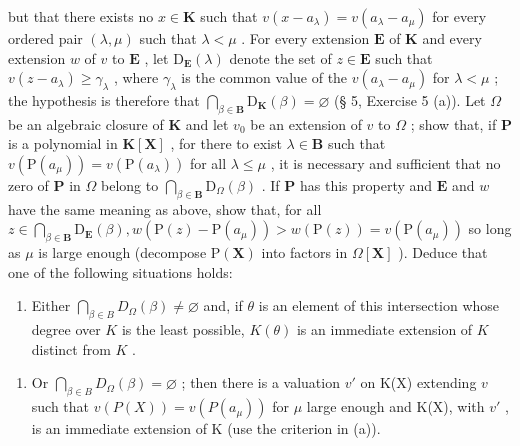 but that there exists no \(x \in \mathbf{K}\) such that \(v(x - a_{\lambda}) = v(a_{\lambda} - a_{\mu})\) for every ordered pair \((\lambda, \mu)\) such that \(\lambda < \mu\) . For every extension \(\mathbf{E}\) of \(\mathbf{K}\) and every extension \(w\) of \(v\) to \(\mathbf{E}\) , let \(\mathrm{D}_{\mathbf{E}}(\lambda)\) denote the set of \(z \in \mathbf{E}\) such that \(v(z - a_{\lambda}) \geqslant \gamma_{\lambda}\) , where \(\gamma_{\lambda}\) is the common value of the \(v(a_{\lambda} - a_{\mu})\) for \(\lambda < \mu\) ; the hypothesis is therefore that \(\bigcap_{\beta \in \mathbf{B}} \mathrm{D}_{\mathbf{K}}(\beta) = \varnothing\) (§ 5, Exercise 5 (a)). Let \(\Omega\) be an algebraic closure of \(\mathbf{K}\) and let \(v_0\) be an extension of \(v\) to \(\Omega\) ; show that, if \(\mathbf{P}\) is a polynomial in \(\mathbf{K}[\mathbf{X}]\) , for there to exist \(\lambda \in \mathbf{B}\) such that \(v(\mathrm{P}(a_{\mu})) = v(\mathrm{P}(a_{\lambda}))\) for all \(\lambda \leqslant \mu\) , it is necessary and sufficient that no zero of \(\mathbf{P}\) in \(\Omega\) belong to \(\bigcap_{\beta \in \mathbf{B}} \mathrm{D}_{\Omega}(\beta)\) . If \(\mathbf{P}\) has this property and \(\mathbf{E}\) and \(w\) have the same meaning as above, show that, for all \(z \in \bigcap_{\beta \in \mathbf{B}} \mathrm{D}_{\mathbf{E}}(\beta), w(\mathrm{P}(z) - \mathrm{P}(a_{\mu})) > w(\mathrm{P}(z)) = v(\mathrm{P}(a_{\mu}))\) so long as \(\mu\) is large enough (decompose \(\mathrm{P}(\mathbf{X})\) into factors in \(\Omega[\mathbf{X}]\) ). Deduce that one of the following situations holds:

\begin{enumerate}
\def\labelenumi{(\arabic{enumi})}
\tightlist
\item
  Either \(\bigcap_{\beta \in B} D_{\Omega}(\beta) \neq \varnothing\) and, if \(\theta\) is an element of this intersection whose degree over \(K\) is the least possible, \(K(\theta)\) is an immediate extension of \(K\) distinct from \(K\) .
\end{enumerate}

\begin{enumerate}
\def\labelenumi{(\arabic{enumi})}
\setcounter{enumi}{1}
\tightlist
\item
  Or \(\bigcap_{\beta \in B} D_{\Omega}(\beta) = \varnothing\) ; then there is a valuation \(v'\) on K(X) extending \(v\) such that \(v(P(X)) = v(P(a_\mu))\) for \(\mu\) large enough and K(X), with \(v'\) , is an immediate extension of K (use the criterion in (a)).
\end{enumerate}


